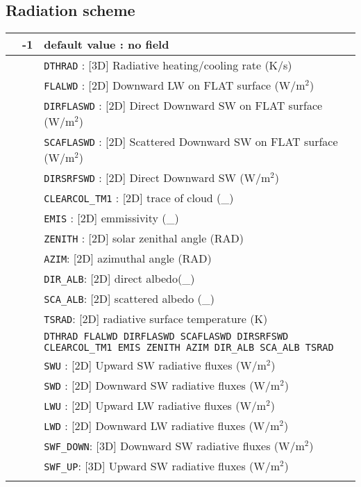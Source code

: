 \subsection{Radiation scheme}
\begin{center}
\begin{tabular}{|>{\centering}p{3cm}|>{\centering}p{2.5cm}|p{11cm}|}
 \hline
\multirow{47}{*}{NRAD\_3D}\label{nrad3d}\index{NRAD\_3D!\innam{NAM\_DIAG}} & {\bf -1} & default value : no field\\\cline{2-3}
&\multirow{12}{*}{0} & {\tt DTHRAD} : [3D] Radiative heating/cooling rate (K/s) \\\cline{3-3}
& &{\tt FLALWD} : [2D] Downward LW on FLAT surface  (W/m$^2$) \\\cline{3-3}
& &{\tt DIRFLASWD} : [2D] Direct Downward SW on FLAT surface  (W/m$^2$) \\\cline{3-3}
& &{\tt SCAFLASWD} : [2D] Scattered Downward SW on FLAT surface (W/m$^2$) \\\cline{3-3}
& &{\tt DIRSRFSWD} : [2D] Direct Downward SW  (W/m$^2$) \\\cline{3-3}
& & {\tt CLEARCOL\_TM1} : [2D] trace of cloud (\_)\\\cline{3-3}
& & {\tt  EMIS} : [2D] emmissivity (\_)\\\cline{3-3}
& & {\tt ZENITH} : [2D] solar zenithal angle (RAD)\\\cline{3-3}
& & {\tt AZIM}: [2D]  azimuthal angle (RAD)\\\cline{3-3}
& & {\tt DIR\_ALB}: [2D] direct albedo(\_)\\\cline{3-3}
& & {\tt SCA\_ALB}: [2D]  scattered albedo (\_)\\\cline{3-3}
& & {\tt TSRAD}: [2D] radiative surface temperature (K)\\\cline{2-3}
&\multirow{12}{*}{1} & {\tt DTHRAD FLALWD DIRFLASWD SCAFLASWD DIRSRFSWD CLEARCOL\_TM1 EMIS ZENITH AZIM DIR\_ALB SCA\_ALB TSRAD}\\\cline{3-3}
&&{\tt SWU} : [2D] Upward SW radiative fluxes (W/m$^2$)\\ \cline{3-3}
&&{\tt SWD} : [2D] Downward SW radiative fluxes (W/m$^2$)\\ \cline{3-3}
&&{\tt LWU} : [2D] Upward LW radiative fluxes (W/m$^2$) \\ \cline{3-3}
&&{\tt LWD} : [2D] Downward LW radiative fluxes (W/m$^2$) \\ \cline{3-3}
& & {\tt SWF\_DOWN}: [3D] Downward SW radiative fluxes (W/m$^2$)\\\cline{3-3}
& & {\tt SWF\_UP}: [3D] Upward SW radiative fluxes (W/m$^2$)\\\cline{3-3}

\end{tabular}
\end{center}
